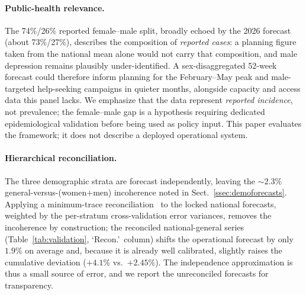 \documentclass[runningheads]{llncs}
\begin{document}
\paragraph{Public-health relevance.}
The 74\%/\hspace{0pt}26\% reported female--male split, broadly echoed by the
2026 forecast (about 73\%/\hspace{0pt}27\%), describes the composition of
\emph{reported cases}: a planning figure taken from the national mean alone
would not carry that composition, and male depression remains plausibly
under-identified. A sex-disaggregated 52-week forecast could therefore inform
planning for the February--May peak and male-targeted help-seeking campaigns
in quieter months, alongside capacity and access data this panel lacks. We
emphasize that the data represent \emph{reported incidence}, not
prevalence; the female--male gap is a hypothesis requiring dedicated
epidemiological validation before being used as policy input. This
paper evaluates the framework; it does not describe a deployed
operational system.

\paragraph{Hierarchical reconciliation.}
The three demographic strata are forecast independently, leaving the
${\sim}2.3\%$ general-versus-(women$+$men) incoherence noted in
Sect.~\ref{ssec:demoforecasts}. Applying a minimum-trace
reconciliation~\cite{wickramasuriya2019} to the locked national
forecasts, weighted by the per-stratum cross-validation error
variances, removes the incoherence by construction; the reconciled
national-general series (Table~\ref{tab:validation}, `Recon.'\ column)
shifts the operational forecast by only $1.9\%$ on average and, because
it is already well calibrated, slightly raises the cumulative deviation
($+4.1\%$ vs.\ $+2.45\%$). The independence approximation is thus a
small source of error, and we report the unreconciled forecasts for
transparency.
\end{document}
